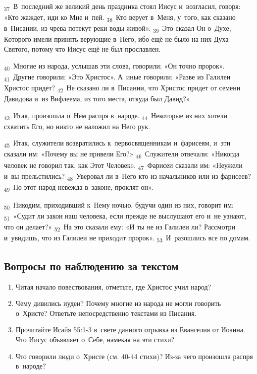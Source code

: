 \documentclass[a4paper,12pt]{article}
\begin{document}
\textsubscript{37}~В~последний же великий день праздника стоял Иисус и~возгласил, говоря: «Кто жаждет, иди ко Мне и~пей.
\textsubscript{38}~Кто верует в~Меня, у~того, как сказано в~Писании, из чрева потекут реки воды живой».
\textsubscript{39}~Это сказал Он о~Духе, Которого имели принять верующие в~Него, ибо ещё не было на них Духа Святого, потому что Иисус ещё не был прославлен.

\textsubscript{40}~Многие из народа, услышав эти слова, говорили: «Он точно пророк».
\textsubscript{41}~Другие говорили: «Это Христос». А~иные говорили: «Разве из Галилеи Христос придет?
\textsubscript{42}~Не сказано ли в~Писании, что Христос придет от семени Давидова и~из Вифлеема, из того места, откуда был Давид?»

\textsubscript{43}~Итак, произошла о~Нем распря в~народе.
\textsubscript{44}~Некоторые из них хотели схватить Его, но никто не наложил на Него рук.

\textsubscript{45}~Итак, служители возвратились к~первосвященникам и~фарисеям, и~эти сказали им: «Почему вы не привели Его?»
\textsubscript{46}~Служители отвечали: «Никогда человек не говорил так, как Этот Человек».
\textsubscript{47}~Фарисеи сказали им: «Неужели и~вы прельстились?
\textsubscript{48}~Уверовал ли в~Него кто из начальников или из фарисеев?
\textsubscript{49}~Но этот народ невежда в~законе, проклят он».

\textsubscript{50}~Никодим, приходивший к~Нему ночью, будучи один из них, говорит им:
\textsubscript{51}~«Судит ли закон наш человека, если прежде не выслушают его и~не узнают, что он делает?»
\textsubscript{52}~На это сказали ему: «И ты не из Галилеи ли? Рассмотри и~увидишь, что из Галилеи не приходит пророк».
\textsubscript{53}~И~разошлись все по домам. 

\subsection*{Вопросы по наблюдению за текстом}
\begin{enumerate}
    \item Читая начало повествования, отметьте, где Христос учил народ? 
    
    \myline
    
    \item Чему дивились иудеи? Почему многие из народа не могли говорить о~Христе? Ответьте непосредственно текстами из Писания. 
    
    \myline
    
    \myline
    \item Прочитайте Исайя 55:1-3 в~свете данного отрывка из Евангелия от Иоанна. Что Иисус объявляет о~Себе, намекая на эти стихи? 
    
    \myline
    
    \myline
    \item Что говорили люди о~Христе (см. 40-44 стихи)? Из-за чего произошла распря в~народе? 
    
    \myline
    
    \myline
\end{enumerate}
\end{document}
